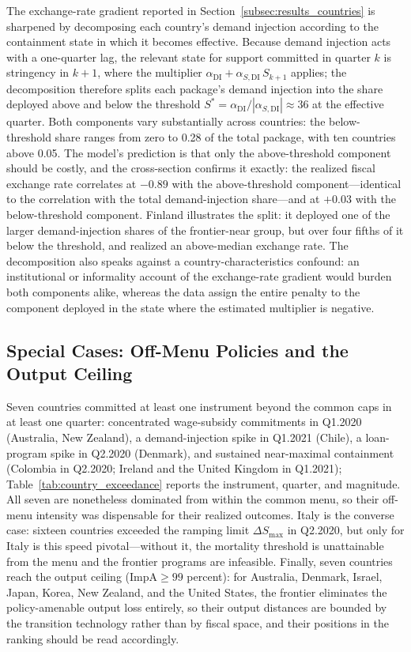\documentclass[12pt, a4paper]{article}
\begin{document}
The exchange-rate gradient reported in
Section~\ref{subsec:results_countries} is sharpened by decomposing each
country's demand injection according to the containment state in which it
becomes effective. Because demand injection acts with a one-quarter lag, the
relevant state for support committed in quarter \(k\) is stringency in
\(k+1\), where the multiplier \(\alpha_{\text{DI}} +
\alpha_{S,\text{DI}}\,S_{k+1}\) applies; the decomposition therefore splits
each package's demand injection into the share deployed above and below the
threshold \(S^{*} = \alpha_{\text{DI}}/|\alpha_{S,\text{DI}}| \approx 36\)
at the effective quarter. Both components vary substantially across
countries: the below-threshold share ranges from zero to 0.28 of the total
package, with ten countries above 0.05. The model's prediction is that only
the above-threshold component should be costly, and the cross-section
confirms it exactly: the realized fiscal exchange rate correlates at
\(-0.89\) with the above-threshold component---identical to the correlation
with the total demand-injection share---and at \(+0.03\) with the
below-threshold component. Finland illustrates the split: it deployed one of
the larger demand-injection shares of the frontier-near group, but over four
fifths of it below the threshold, and realized an above-median exchange
rate. The decomposition also speaks against a country-characteristics
confound: an institutional or informality account of the exchange-rate
gradient would burden both components alike, whereas the data assign the
entire penalty to the component deployed in the state where the estimated
multiplier is negative.

\subsection{Special Cases: Off-Menu Policies and the Output Ceiling}
\label{app:country_special}

Seven countries committed at least one instrument beyond the common caps in
at least one quarter: concentrated wage-subsidy commitments in Q1.2020
(Australia, New Zealand), a demand-injection spike in Q1.2021 (Chile), a
loan-program spike in Q2.2020 (Denmark), and sustained near-maximal
containment (Colombia in Q2.2020; Ireland and the United Kingdom in
Q1.2021); Table~\ref{tab:country_exceedance} reports the instrument, quarter,
and magnitude. All seven are nonetheless dominated from within the common
menu, so their off-menu intensity was dispensable for their realized
outcomes. Italy is the converse case: sixteen countries exceeded the ramping
limit \(\Delta S_{\max}\) in Q2.2020, but only for Italy is this speed
pivotal---without it, the mortality threshold is unattainable from the menu
and the frontier programs are infeasible. Finally, seven countries reach the
output ceiling (\(\text{ImpA} \ge 99\) percent): for Australia, Denmark,
Israel, Japan, Korea, New Zealand, and the United States, the frontier
eliminates the policy-amenable output loss entirely, so their output
distances are bounded by the transition technology rather than by fiscal
space, and their positions in the ranking should be read accordingly.
\end{document}
